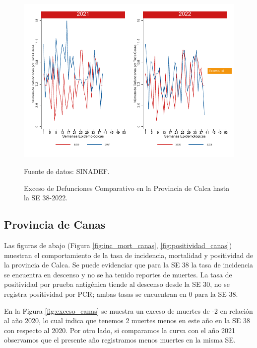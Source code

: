 \documentclass[12pt,a4paper,openany]{book}
\begin{document}
	\begin{figure}[h]
		\caption{Exceso de Defunciones Comparativo en la Provincia de Calca hasta la SE 38-2022.}\label{fig:exceso_calca}
		\begin{center}
			\includegraphics[width=0.7\linewidth]{../figuras/exceso_3.pdf}
		\end{center}
		{\footnotesize {Fuente de datos: SINADEF.}}
	\end{figure}
	
	\clearpage
	
	\subsection*{Provincia de Canas}
	\noindent Las figuras de abajo (Figura \ref{fig:inc_mort_canas}, \ref{fig:positividad_canas}) muestran el comportamiento de la tasa de incidencia, mortalidad y  positividad de  la provincia de Calca. Se puede evidenciar que para la SE 38 la tasa de incidencia se encuentra en descenso y no se ha tenido reportes de muertes. La tasa de positividad por prueba antigénica tiende al descenso desde la SE 30, no se registra positividad por PCR; ambas tasas se encuentran en 0 para la SE 38.
	
	En la Figura \ref{fig:exceso_canas} se muestra un exceso de muertes de -2 en relación al año 2020, lo cual indica que tenemos 2 muertes menos en este año en la SE 38 con respecto al 2020. Por otro lado, si comparamos la curva con el año 2021 observamos que el presente año registramos menos muertes en la misma SE.
	
\end{document}
